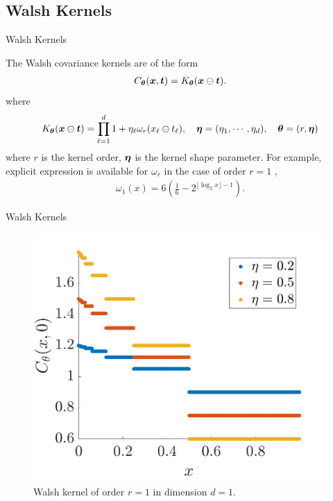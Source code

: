 \documentclass[handout, 10pt,compress,xcolor={usenames,dvipsnames}]{beamer} %
\newcommand{\bm}[1]{\boldsymbol{#1}}
\renewcommand{\vtheta}{{\bm{\theta}}}
\begin{document}
\subsection{Walsh Kernels}

\begin{frame}{Walsh Kernels}

The Walsh covariance kernels are of the form
\begin{align}
\label{eqn:digital_shift_in_kernel}
C_{\vtheta}(\vx, \vt) = K_{\vtheta} (\vx \ominus \vt).
\end{align}
where
\begin{align}
\label{eqn:walsh_kernel}
K_{\vtheta} (\vx \ominus \vt) =  
\prod_{\ell=1}^d  1 + \eta_\ell \omega_{r} (x_\ell \ominus t_\ell), \quad \veta = (\eta_1, \cdots, \eta_d), \quad \vtheta = (r, \veta)
\end{align}
where $r$ is the kernel order, $\boldsymbol{\eta}$ is the kernel shape parameter.
For example, explicit expression is available for $\omega_{r}$ in the case of order $r=1$ \cite{Nuyens2013}, %
\begin{align}
\label{eqn:omega1}
\omega_1(x) 
= 6\left( \frac 16 - 2^{\lfloor \log_2 x \rfloor -1 }\right).
\end{align}
\end{frame}


\begin{frame}{Walsh Kernels}
	\vspace{-6ex}
\begin{figure}
	\centering
	\includegraphics[width=0.7\linewidth]{"../figures/walsh_kernel dim_1"}
	\caption[Walsh kernel]{Walsh kernel of order $r=1$ in dimension $d=1$. } 
	\label{fig:walshkernel-dim1}
\end{figure}
\end{frame}
\end{document}
